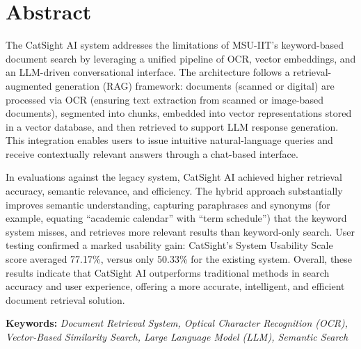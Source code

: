 \chapter*{Abstract}

The CatSight AI system addresses the limitations of MSU-IIT’s keyword-based document search by leveraging a unified pipeline of OCR, vector embeddings, and an LLM-driven conversational interface. The architecture follows a retrieval-augmented generation (RAG) framework: documents (scanned or digital) are processed via OCR (ensuring text extraction from scanned or image-based documents), segmented into chunks, embedded into vector representations stored in a vector database, and then retrieved to support LLM response generation. This integration enables users to issue intuitive natural-language queries and receive contextually relevant answers through a chat-based interface.

In evaluations against the legacy system, CatSight AI achieved higher retrieval accuracy, semantic relevance, and efficiency. The hybrid approach substantially improves semantic understanding, capturing paraphrases and synonyms (for example, equating “academic calendar” with “term schedule”) that the keyword system misses, and retrieves more relevant results than keyword-only search. User testing confirmed a marked usability gain: CatSight’s System Usability Scale score averaged 77.17\%, versus only 50.33\% for the existing system. Overall, these results indicate that CatSight AI outperforms traditional methods in search accuracy and user experience, offering a more accurate, intelligent, and efficient document retrieval solution.

\vspace{1em}
\noindent\textbf{Keywords:} \emph{Document Retrieval System, Optical Character Recognition (OCR), Vector-Based Similarity Search, Large Language Model (LLM), Semantic Search}
\clearpage
